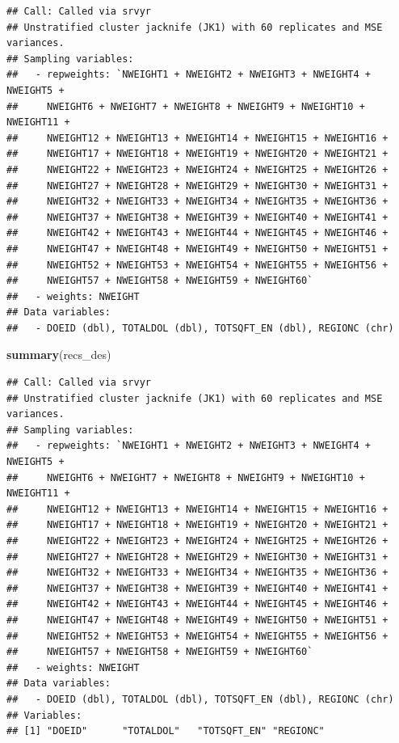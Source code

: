 \documentclass[
]{krantz}
\makeatletter
\newenvironment{Shaded}{\begin{snugshade}}{\end{snugshade}}
\newcommand{\FunctionTok}[1]{\textcolor[rgb]{0.27,0.27,0.27}{\textbf{#1}}}
\newcommand{\NormalTok}[1]{#1}
\newenvironment{kframe}{%
\medskip{}
\setlength{\fboxsep}{.8em}
 \def\at@end@of@kframe{}%
 \ifinner\ifhmode%
  \def\at@end@of@kframe{\end{minipage}}%
  \begin{minipage}{\columnwidth}%
 \fi\fi%
 \def\FrameCommand##1{\hskip\@totalleftmargin \hskip-\fboxsep
 \colorbox{shadecolor}{##1}\hskip-\fboxsep
     \hskip-\linewidth \hskip-\@totalleftmargin \hskip\columnwidth}%
 \MakeFramed {\advance\hsize-\width
   \@totalleftmargin\z@ \linewidth\hsize
   \@setminipage}}%
 {\par\unskip\endMakeFramed%
 \at@end@of@kframe}
\renewenvironment{Shaded}{\begin{kframe}}{\end{kframe}}
\makeatother
\begin{document}
\begin{verbatim}
## Call: Called via srvyr
## Unstratified cluster jacknife (JK1) with 60 replicates and MSE variances.
## Sampling variables:
##   - repweights: `NWEIGHT1 + NWEIGHT2 + NWEIGHT3 + NWEIGHT4 + NWEIGHT5 +
##     NWEIGHT6 + NWEIGHT7 + NWEIGHT8 + NWEIGHT9 + NWEIGHT10 + NWEIGHT11 +
##     NWEIGHT12 + NWEIGHT13 + NWEIGHT14 + NWEIGHT15 + NWEIGHT16 +
##     NWEIGHT17 + NWEIGHT18 + NWEIGHT19 + NWEIGHT20 + NWEIGHT21 +
##     NWEIGHT22 + NWEIGHT23 + NWEIGHT24 + NWEIGHT25 + NWEIGHT26 +
##     NWEIGHT27 + NWEIGHT28 + NWEIGHT29 + NWEIGHT30 + NWEIGHT31 +
##     NWEIGHT32 + NWEIGHT33 + NWEIGHT34 + NWEIGHT35 + NWEIGHT36 +
##     NWEIGHT37 + NWEIGHT38 + NWEIGHT39 + NWEIGHT40 + NWEIGHT41 +
##     NWEIGHT42 + NWEIGHT43 + NWEIGHT44 + NWEIGHT45 + NWEIGHT46 +
##     NWEIGHT47 + NWEIGHT48 + NWEIGHT49 + NWEIGHT50 + NWEIGHT51 +
##     NWEIGHT52 + NWEIGHT53 + NWEIGHT54 + NWEIGHT55 + NWEIGHT56 +
##     NWEIGHT57 + NWEIGHT58 + NWEIGHT59 + NWEIGHT60` 
##   - weights: NWEIGHT 
## Data variables: 
##   - DOEID (dbl), TOTALDOL (dbl), TOTSQFT_EN (dbl), REGIONC (chr)
\end{verbatim}

\begin{Shaded}
\begin{Highlighting}[]
\FunctionTok{summary}\NormalTok{(recs\_des)}
\end{Highlighting}
\end{Shaded}

\begin{verbatim}
## Call: Called via srvyr
## Unstratified cluster jacknife (JK1) with 60 replicates and MSE variances.
## Sampling variables:
##   - repweights: `NWEIGHT1 + NWEIGHT2 + NWEIGHT3 + NWEIGHT4 + NWEIGHT5 +
##     NWEIGHT6 + NWEIGHT7 + NWEIGHT8 + NWEIGHT9 + NWEIGHT10 + NWEIGHT11 +
##     NWEIGHT12 + NWEIGHT13 + NWEIGHT14 + NWEIGHT15 + NWEIGHT16 +
##     NWEIGHT17 + NWEIGHT18 + NWEIGHT19 + NWEIGHT20 + NWEIGHT21 +
##     NWEIGHT22 + NWEIGHT23 + NWEIGHT24 + NWEIGHT25 + NWEIGHT26 +
##     NWEIGHT27 + NWEIGHT28 + NWEIGHT29 + NWEIGHT30 + NWEIGHT31 +
##     NWEIGHT32 + NWEIGHT33 + NWEIGHT34 + NWEIGHT35 + NWEIGHT36 +
##     NWEIGHT37 + NWEIGHT38 + NWEIGHT39 + NWEIGHT40 + NWEIGHT41 +
##     NWEIGHT42 + NWEIGHT43 + NWEIGHT44 + NWEIGHT45 + NWEIGHT46 +
##     NWEIGHT47 + NWEIGHT48 + NWEIGHT49 + NWEIGHT50 + NWEIGHT51 +
##     NWEIGHT52 + NWEIGHT53 + NWEIGHT54 + NWEIGHT55 + NWEIGHT56 +
##     NWEIGHT57 + NWEIGHT58 + NWEIGHT59 + NWEIGHT60` 
##   - weights: NWEIGHT 
## Data variables: 
##   - DOEID (dbl), TOTALDOL (dbl), TOTSQFT_EN (dbl), REGIONC (chr)
## Variables: 
## [1] "DOEID"      "TOTALDOL"   "TOTSQFT_EN" "REGIONC"
\end{verbatim}
\end{document}
